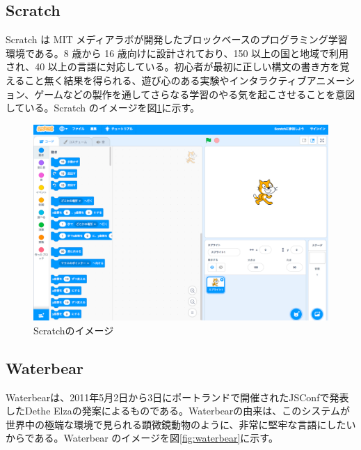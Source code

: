 \documentclass{risepaper}
\begin{document}
    \subsection{Scratch}
 
Scratch\cite{Scratch} は MIT メディアラボが開発したブロックベースのプログラミング学習環境である。8 歳から 16 歳向けに設計されており、150 以上の国と地域で利用され、40 以上の言語に対応している。初心者が最初に正しい構文の書き方を覚えること無く結果を得られる、遊び心のある実験やインタラクティブアニメーション、ゲームなどの製作を通してさらなる学習のやる気を起こさせることを意図している。Scratch のイメージを図\ref{fig:scratch}に示す。 

\begin{figure}[h]
\begin{center}
\includegraphics[scale=0.3]{img/scratch.png}
\caption{Scratchのイメージ}%
\label{fig:scratch}
\end{center}%
\end{figure}%

	\subsection{Waterbear}
    
Waterbear\cite{waterbear}は、2011年5月2日から3日にポートランドで開催されたJSConfで発表したDethe Elzaの発案によるものである。Waterbearの由来は、このシステムが世界中の極端な環境で見られる顕微鏡動物のように、非常に堅牢な言語にしたいからである。Waterbear のイメージを図\ref{fig:waterbear}に示す。 
\end{document}
